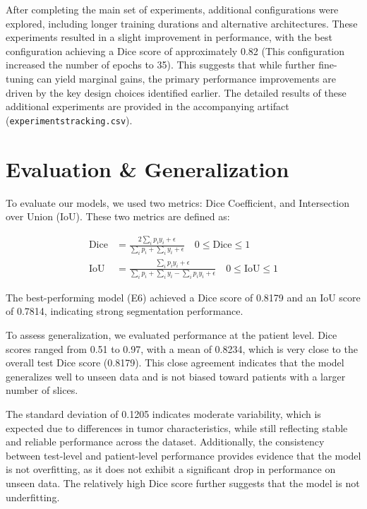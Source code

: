 \documentclass[12pt]{article}
\begin{document}
After completing the main set of experiments, additional configurations were explored, including longer training durations and alternative architectures. These experiments resulted in a slight improvement in performance, with the best configuration achieving a Dice score of approximately 0.82 (This configuration increased the number of epochs to 35). This suggests that while further fine-tuning can yield marginal gains, the primary performance improvements are driven by the key design choices identified earlier. The detailed results of these additional experiments are provided in the accompanying artifact (\texttt{experimentstracking.csv}).

\section{Evaluation \& Generalization}

To evaluate our models, we used two metrics: Dice Coefficient, and Intersection over Union (IoU). These two metrics are defined as:

\begin{align}
\text{Dice} &= \frac{2 \sum_{i} p_i y_i + \epsilon}{\sum_{i} p_i + \sum_{i} y_i + \epsilon}
\quad 0 \leq \text{Dice} \leq 1 \\
\text{IoU} &= \frac{\sum_{i} p_i y_i + \epsilon}{\sum_{i} p_i + \sum_{i} y_i - \sum_{i} p_i y_i + \epsilon}
\quad 0 \leq \text{IoU} \leq 1
\end{align}

The best-performing model (E6) achieved a Dice score of 0.8179 and an IoU score of 0.7814, indicating strong segmentation performance.

To assess generalization, we evaluated performance at the patient level. Dice scores ranged from 0.51 to 0.97, with a mean of 0.8234, which is very close to the overall test Dice score (0.8179). This close agreement indicates that the model generalizes well to unseen data and is not biased toward patients with a larger number of slices.

The standard deviation of 0.1205 indicates moderate variability, which is expected due to differences in tumor characteristics, while still reflecting stable and reliable performance across the dataset. Additionally, the consistency between test-level and patient-level performance provides evidence that the model is not overfitting, as it does not exhibit a significant drop in performance on unseen data. The relatively high Dice score further suggests that the model is not underfitting.
\end{document}
